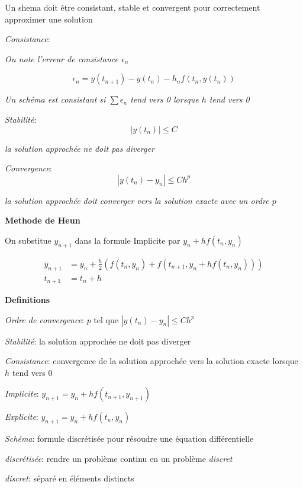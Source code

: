 \documentclass{article}
\newcommand{\smalltext}[1]{
    \scriptsize
    \textit{#1}
    \normalsize
}
\begin{document}
Un shema doit être consistant, stable et convergent pour correctement approximer une solution

\textit{Consistance}: \hrulefill
\smalltext{On note l'erreur de consistance $\epsilon_n$}
\begin{equation*}
    \epsilon_n=y(t_{n+1})-y(t_n)-h_nf(t_n,y(t_n))
\end{equation*}

\smalltext{Un schéma est consistant si $\sum \epsilon_n$ tend vers 0 lorsque $h$ tend vers 0}




\textit{Stabilité}: \hrulefill
\begin{equation*}
    |y(t_n)| \leq C
\end{equation*}
\smalltext{la solution approchée ne doit pas diverger}

\textit{Convergence}: \hrulefill
\begin{equation*}
    |y(t_n) - y_n| \leq C h^p
\end{equation*}
\smalltext{la solution approchée doit converger vers la solution exacte avec un ordre $p$}




\textbf{Methode de Heun}

On substitue $y_{n+1}$ dans la formule Implicite par $y_n + h f(t_n, y_n)$

\begin{align*}
    y_{n+1} &= y_n + \frac{h}{2} (f(t_n, y_n) + f(t_{n+1}, y_n + h f(t_n, y_n))) \\
    t_{n+1} &= t_n + h
\end{align*}



\textbf{Definitions}

\textit{Ordre de convergence}: $p$ tel que $|y(t_n) - y_n| \leq C h^p$

\textit{Stabilité}: la solution approchée ne doit pas diverger

\textit{Consistance}: convergence de la solution approchée vers la solution exacte lorsque $h$ tend vers 0

\textit{Implicite}: $y_{n+1} = y_n + h f(t_{n+1}, y_{n+1})$

\textit{Explicite}: $y_{n+1} = y_n + h f(t_n, y_n)$

\textit{Schéma}: formule discrétisée pour résoudre une équation différentielle

\textit{discrétisée}: rendre un problème continu en un problème \textit{discret}

\textit{discret}: séparé en éléments distincts
\end{document}
